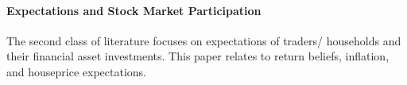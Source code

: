 \documentclass[ProjectABM]{subfiles}
\begin{document}







\paragraph{Expectations and Stock Market Participation}
The second class of literature focuses on expectations of traders/ households and their financial asset investments. This paper relates to return beliefs, inflation, and houseprice expectations.
\end{document}
